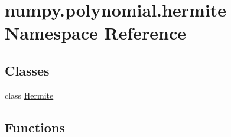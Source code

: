 \hypertarget{namespacenumpy_1_1polynomial_1_1hermite}{}\section{numpy.\+polynomial.\+hermite Namespace Reference}
\label{namespacenumpy_1_1polynomial_1_1hermite}
\subsection*{Classes}
\begin{DoxyCompactItemize}
\item 
class \hyperlink{classnumpy_1_1polynomial_1_1hermite_1_1Hermite}{Hermite}
\end{DoxyCompactItemize}
\subsection*{Functions}
